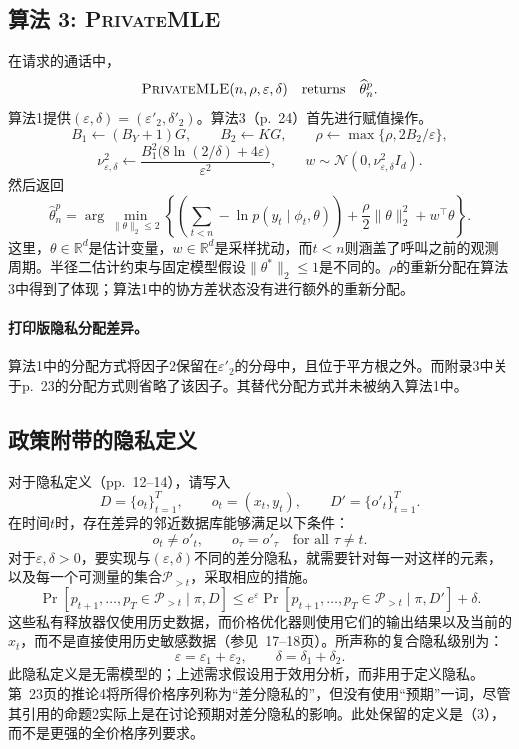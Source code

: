 \documentclass{article}
\begin{document}
\subsection*{算法 3: \textsc{PrivateMLE}}
在请求的通话中，
\[
\textsc{PrivateMLE}(n,\rho,\varepsilon,\delta)
\quad\text{returns}\quad\widehat\theta_n^p.
\]
算法1提供$(\varepsilon,\delta)=(\varepsilon'_2,\delta'_2)$。算法3（p.~24）首先进行赋值操作。
\[
B_1\leftarrow(B_Y+1)G,
\qquad B_2\leftarrow KG,
\qquad \rho\leftarrow\max\{\rho,2B_2/\varepsilon\},
\]
\[
\nu_{\varepsilon,\delta}^{2}\leftarrow
\frac{B_1^2\bigl(8\ln(2/\delta)+4\varepsilon\bigr)}{\varepsilon^2},
\qquad
w\sim\mathcal N(0,\nu_{\varepsilon,\delta}^{2}I_d).
\]
然后返回
\[
\widehat\theta_n^p
=\arg\min_{\|\theta\|_2\le2}
\left\{\left(\sum_{t<n}-\ln p(y_t\mid\phi_t,\theta)\right)
+\frac{\rho}{2}\|\theta\|_2^2+w^{\top}\theta\right\}.
\]
这里，$\theta\in\mathbb R^d$是估计变量，$w\in\mathbb R^d$是采样扰动，而$t<n$则涵盖了呼叫之前的观测周期。半径二估计约束与固定模型假设$\|\theta^*\|_2\le1$是不同的。$\rho$的重新分配在算法3中得到了体现；算法1中的协方差状态没有进行额外的重新分配。

\paragraph{打印版隐私分配差异。}
算法1中的分配方式将因子$2$保留在$\varepsilon'_2$的分母中，且位于平方根之外。而附录3中关于p.~23的分配方式则省略了该因子。其替代分配方式并未被纳入算法1中。

\subsection*{政策附带的隐私定义}
对于隐私定义（pp.~12--14），请写入
\[
D=\{o_t\}_{t=1}^{T},\qquad o_t=(x_t,y_t),
\qquad D'=\{o'_t\}_{t=1}^{T}.
\]
在时间$t$时，存在差异的邻近数据库能够满足以下条件：
\[
o_t\ne o'_t,\qquad o_\tau=o'_\tau\quad\text{for all }\tau\ne t.
\]
对于$\varepsilon,\delta>0$，要实现与$(\varepsilon,\delta)$不同的差分隐私，就需要针对每一对这样的元素，以及每一个可测量的集合$\mathcal P_{>t}$，采取相应的措施。
\begin{equation}
\Pr[p_{t+1},\ldots,p_T\in\mathcal P_{>t}\mid\pi,D]
\le e^{\varepsilon}
\Pr[p_{t+1},\ldots,p_T\in\mathcal P_{>t}\mid\pi,D']+\delta.
\tag{3}
\end{equation}
这些私有释放器仅使用历史数据，而价格优化器则使用它们的输出结果以及当前的$x_t$，而不是直接使用历史敏感数据（参见~17–18页）。所声称的复合隐私级别为：
\[
\varepsilon=\varepsilon_1+\varepsilon_2,
\qquad \delta=\delta_1+\delta_2.
\]
此隐私定义是无需模型的；上述需求假设用于效用分析，而非用于定义隐私。第~23页的推论4将所得价格序列称为“差分隐私的”，但没有使用“预期”一词，尽管其引用的命题2实际上是在讨论预期对差分隐私的影响。此处保留的定义是（3），而不是更强的全价格序列要求。
\end{document}

